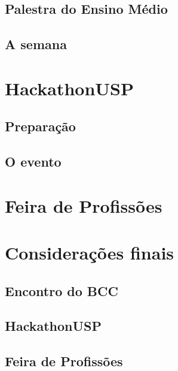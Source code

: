 \documentclass[12pt,letterpaper]{article}
\begin{document}
	\subsection{Palestra do Ensino Médio}
	
	\subsection{A semana}
	
	\section{HackathonUSP}
	
	\subsection{Preparação}
	
	\subsection{O evento}
	
	\section{Feira de Profissões}
	
	\section*{Considerações finais}
	
	\subsection*{Encontro do BCC}
	
	\subsection*{HackathonUSP}
	
	\subsection*{Feira de Profissões}
	
	
	
\end{document}
